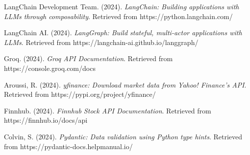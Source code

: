 \documentclass[11pt,a4paper]{article}
\begin{document}
\begin{thebibliography}{9}

LangChain Development Team. (2024). \textit{LangChain: Building applications with LLMs through composability}. Retrieved from https://python.langchain.com/

LangChain AI. (2024). \textit{LangGraph: Build stateful, multi-actor applications with LLMs}. Retrieved from https://langchain-ai.github.io/langgraph/

Groq. (2024). \textit{Groq API Documentation}. Retrieved from https://console.groq.com/docs

Aroussi, R. (2024). \textit{yfinance: Download market data from Yahoo! Finance's API}. Retrieved from https://pypi.org/project/yfinance/

Finnhub. (2024). \textit{Finnhub Stock API Documentation}. Retrieved from https://finnhub.io/docs/api

Colvin, S. (2024). \textit{Pydantic: Data validation using Python type hints}. Retrieved from https://pydantic-docs.helpmanual.io/

\end{thebibliography}
\end{document}
